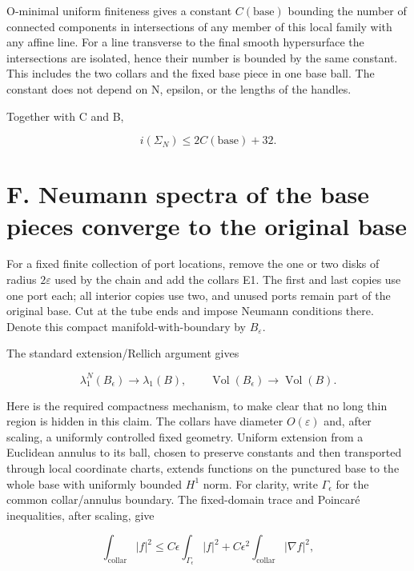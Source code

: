 \documentclass[11pt,a4paper]{article}
\begin{document}
O-minimal uniform finiteness gives a constant \(C(\mathrm{base})\)
bounding the number of connected components in intersections of any
member of this local family with any affine line. For a line transverse
to the final smooth hypersurface the intersections are isolated, hence
their number is bounded by the same constant. This includes the two
collars and the fixed base piece in one base ball. The constant does not
depend on N, epsilon, or the lengths of the handles.

Together with C and B,

\[
 i(\Sigma_N)\le 2C(\text{base})+32.
 \tag{E2}
\]

\hypertarget{1022-f.-neumann-spectra-of-the-base-pieces-converge-to-the-original-base}{%
\section{F. Neumann spectra of the base pieces converge to the original
base}\label{1022-f.-neumann-spectra-of-the-base-pieces-converge-to-the-original-base}}

For a fixed finite collection of port locations, remove the one or two
disks of radius \(2\varepsilon\) used by the chain and add the collars
E1. The first and last copies use one port each; all interior copies use
two, and unused ports remain part of the original base. Cut at the tube
ends and impose Neumann conditions there. Denote this compact
manifold-with-boundary by \(B_\varepsilon\).

The standard extension/Rellich argument gives

\[
 \lambda_1^N(B_\epsilon)\longrightarrow\lambda_1(B),\qquad
 \operatorname{Vol}(B_\epsilon)\longrightarrow\operatorname{Vol}(B).
 \tag{F1}
\]

Here is the required compactness mechanism, to make clear that no long
thin region is hidden in this claim. The collars have diameter
\(O(\varepsilon )\) and, after scaling, a uniformly controlled fixed
geometry. Uniform extension from a Euclidean annulus to its ball, chosen
to preserve constants and then transported through local coordinate
charts, extends functions on the punctured base to the whole base with
uniformly bounded \(H^1\) norm. For clarity, write \(\Gamma_\epsilon\)
for the common collar/annulus boundary. The fixed-domain trace and
Poincaré inequalities, after scaling, give

\[
 \int_{\mathrm{collar}} |f|^2
 \le C\epsilon\int_{\Gamma_\epsilon}|f|^2
       +C\epsilon^2\int_{\mathrm{collar}}|\nabla f|^2,
\]
\end{document}
